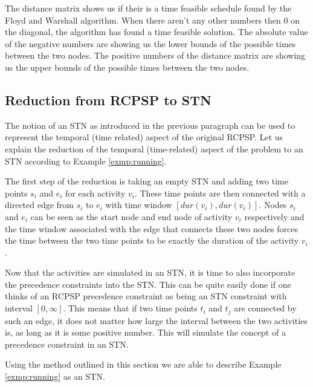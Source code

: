 \documentclass{article}
\theoremstyle{definition}
\newcommand{\dur}[1]{\ensuremath{dur(v_{#1})}} %
\begin{document}
The distance matrix shows us if their is a time feasible schedule found by the Floyd and Warshall algorithm.
When there aren't any other numbers then $0$ on the diagonal, the algorithm has found a time feasible solution.
The absolute value of the negative numbers are showing us the lower bounds of the possible times between the two nodes.
The positive numbers of the distance matrix are showing us the upper bounds of the possible times between the two nodes.

\subsection{Reduction from RCPSP to STN}
The notion of an STN as introduced in the previous paragraph can be used to represent the temporal (time related) aspect of the original RCPSP. Let us explain the reduction of the temporal (time-related) aspect of the problem to an STN according to Example \ref{exmp:running}.

The first step of the reduction is taking an empty STN and adding two time points $s_i$ and $e_i$ for each activity $v_i$. 
These time points are then connected with a directed edge from $s_i$ to $e_i$ with time window $[\dur{i}, \dur{i}]$. 
Nodes $s_i$ and $e_i$ can be seen as the start node and end node of activity $v_i$ respectively and the time window associated with the edge that connects these two nodes forces the time between the two time points to be exactly the duration of the activity $v_i$.

Now that the activities are simulated in an STN, it is time to also incorporate the precedence constraints into the STN. This can be quite easily done if one thinks of an RCPSP precedence constraint as being an STN constraint with interval $[0,\infty]$. This means that if two time points $t_i$ and $t_j$ are connected by such an edge, it does not matter how large the interval between the two activities is, as long as it is some positive number. This will simulate the concept of a precedence constraint in an STN.

Using the method outlined in this section we are able to describe Example \ref{exmp:running} as an STN. 
\end{document}
